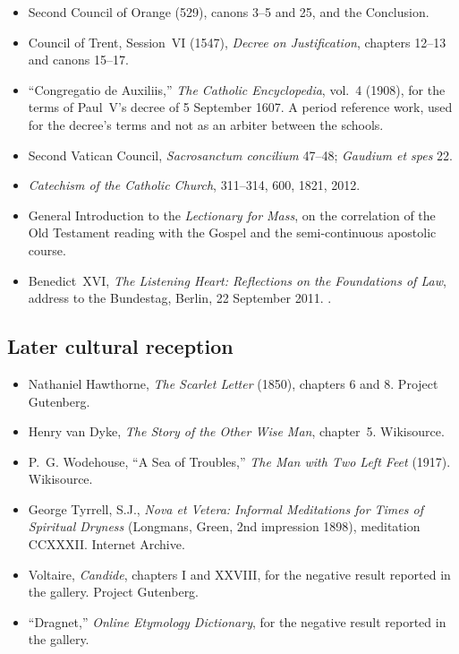 \begin{itemize}
\item Second Council of Orange (529), canons 3--5 and 25, and the Conclusion.
\item Council of Trent, Session~VI (1547), \emph{Decree on Justification}, chapters 12--13 and canons 15--17.
\item ``Congregatio de Auxiliis,'' \emph{The Catholic Encyclopedia}, vol.~4 (1908), for the terms of Paul~V's decree of 5 September 1607. A period reference work, used for the decree's terms and not as an arbiter between the schools.
\item Second Vatican Council, \emph{Sacrosanctum concilium} 47--48; \emph{Gaudium et spes} 22.
\item \emph{Catechism of the Catholic Church}, 311--314, 600, 1821, 2012.
\item General Introduction to the \emph{Lectionary for Mass}, on the correlation of the Old Testament reading with the Gospel and the semi-continuous apostolic course.
\item Benedict~XVI, \emph{The Listening Heart: Reflections on the Foundations of Law}, address to the Bundestag, Berlin, 22 September 2011. .
\end{itemize}

\subsection*{Later cultural reception}

\begin{itemize}
\item Nathaniel Hawthorne, \emph{The Scarlet Letter} (1850), chapters 6 and 8. Project Gutenberg.
\item Henry van Dyke, \emph{The Story of the Other Wise Man}, chapter~5. Wikisource.
\item P.~G. Wodehouse, ``A Sea of Troubles,'' \emph{The Man with Two Left Feet} (1917). Wikisource.
\item George Tyrrell, S.J., \emph{Nova et Vetera: Informal Meditations for Times of Spiritual Dryness} (Longmans, Green, 2nd impression 1898), meditation CCXXXII. Internet Archive.
\item Voltaire, \emph{Candide}, chapters I and XXVIII, for the negative result reported in the gallery. Project Gutenberg.
\item ``Dragnet,'' \emph{Online Etymology Dictionary}, for the negative result reported in the gallery.
\end{itemize}
